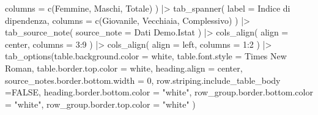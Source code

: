 \documentclass[
]{article}
\newenvironment{Shaded}{\begin{snugshade}}{\end{snugshade}}
\newcommand{\AttributeTok}[1]{\textcolor[rgb]{0.40,0.45,0.13}{#1}}
\newcommand{\ConstantTok}[1]{\textcolor[rgb]{0.56,0.35,0.01}{#1}}
\newcommand{\DecValTok}[1]{\textcolor[rgb]{0.68,0.00,0.00}{#1}}
\newcommand{\FunctionTok}[1]{\textcolor[rgb]{0.28,0.35,0.67}{#1}}
\newcommand{\NormalTok}[1]{\textcolor[rgb]{0.00,0.23,0.31}{#1}}
\newcommand{\SpecialCharTok}[1]{\textcolor[rgb]{0.37,0.37,0.37}{#1}}
\newcommand{\StringTok}[1]{\textcolor[rgb]{0.13,0.47,0.30}{#1}}
\begin{document}
\begin{Shaded}
\begin{Highlighting}[]
    \AttributeTok{columns =} \FunctionTok{c}\NormalTok{(Femmine, Maschi, Totale)}
\NormalTok{  ) }\SpecialCharTok{|\textgreater{}} 
  \FunctionTok{tab\_spanner}\NormalTok{(}
    \AttributeTok{label =} \StringTok{\textquotesingle{}Indice di dipendenza\textquotesingle{}}\NormalTok{,}
    \AttributeTok{columns =} \FunctionTok{c}\NormalTok{(Giovanile, Vecchiaia, }\StringTok{\textasciigrave{}}\AttributeTok{Complessivo}\StringTok{\textasciigrave{}}\NormalTok{)}
\NormalTok{  ) }\SpecialCharTok{|\textgreater{}} 
  \FunctionTok{tab\_source\_note}\NormalTok{(}
    \AttributeTok{source\_note =} \StringTok{\textquotesingle{}Dati Demo.Istat\textquotesingle{}}
\NormalTok{  ) }\SpecialCharTok{|\textgreater{}} 
  \FunctionTok{cols\_align}\NormalTok{(}
    \AttributeTok{align =} \StringTok{\textquotesingle{}center\textquotesingle{}}\NormalTok{,}
    \AttributeTok{columns =} \DecValTok{3}\SpecialCharTok{:}\DecValTok{9}
\NormalTok{  ) }\SpecialCharTok{|\textgreater{}}
  \FunctionTok{cols\_align}\NormalTok{(}
    \AttributeTok{align =} \StringTok{\textquotesingle{}left\textquotesingle{}}\NormalTok{,}
    \AttributeTok{columns =} \DecValTok{1}\SpecialCharTok{:}\DecValTok{2}
\NormalTok{  ) }\SpecialCharTok{|\textgreater{}}
  \FunctionTok{tab\_options}\NormalTok{(}\AttributeTok{table.background.color =} \StringTok{\textquotesingle{}white\textquotesingle{}}\NormalTok{,}
              \AttributeTok{table.font.style =} \StringTok{\textquotesingle{}Times New Roman\textquotesingle{}}\NormalTok{,}
              \AttributeTok{table.border.top.color =} \StringTok{\textquotesingle{}white\textquotesingle{}}\NormalTok{,}
              \AttributeTok{heading.align =} \StringTok{\textquotesingle{}center\textquotesingle{}}\NormalTok{,}
              \AttributeTok{source\_notes.border.bottom.width =} \DecValTok{0}\NormalTok{, }
              \AttributeTok{row.striping.include\_table\_body =}\ConstantTok{FALSE}\NormalTok{,}
              \AttributeTok{heading.border.bottom.color =} \StringTok{"white"}\NormalTok{,}
              \AttributeTok{row\_group.border.bottom.color =} \StringTok{"white"}\NormalTok{,}
              \AttributeTok{row\_group.border.top.color =} \StringTok{"white"}
\NormalTok{              )}
\end{Highlighting}
\end{Shaded}
\end{document}
